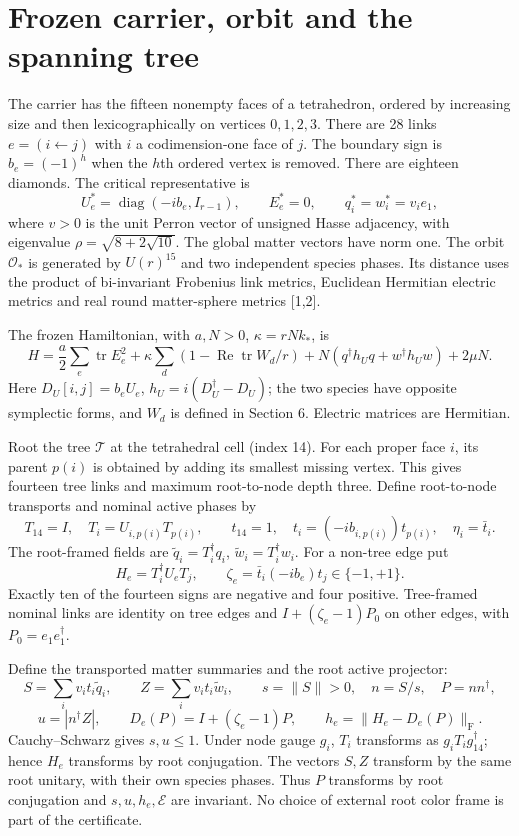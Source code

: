 \documentclass[11pt,a4paper]{article}
\newcommand{\tr}{\operatorname{tr}}\newcommand{\diag}{\operatorname{diag}}\newcommand{\Rea}{\operatorname{Re}}\newcommand{\Om}{\mathcal O_*}\newcommand{\F}{\mathrm F}
\begin{document}
\section{Frozen carrier, orbit and the spanning tree}
The carrier has the fifteen nonempty faces of a tetrahedron, ordered by increasing size and then lexicographically on vertices $0,1,2,3$. There are 28 links $e=(i\leftarrow j)$ with $i$ a codimension-one face of $j$. The boundary sign is $b_e=(-1)^h$ when the $h$th ordered vertex is removed. There are eighteen diamonds. The critical representative is
\[
U_e^*=\diag(-ib_e,I_{r-1}),\qquad E_e^*=0,\qquad q_i^*=w_i^*=v_i e_1,
\]
where $v>0$ is the unit Perron vector of unsigned Hasse adjacency, with eigenvalue $\rho=\sqrt{8+2\sqrt{10}}$. The global matter vectors have norm one. The orbit $\Om$ is generated by $U(r)^{15}$ and two independent species phases. Its distance uses the product of bi-invariant Frobenius link metrics, Euclidean Hermitian electric metrics and real round matter-sphere metrics [1,2].

The frozen Hamiltonian, with $a,N>0$, $\kappa=rNk_*$, is
\[
H=\frac a2\sum_e\tr E_e^2+\kappa\sum_d(1-\Rea\tr W_d/r)
+N(q^\dagger h_Uq+w^\dagger h_Uw)+2\mu N.
\]
Here $D_U[i,j]=b_eU_e$, $h_U=i(D_U^\dagger-D_U)$; the two species have opposite symplectic forms, and $W_d$ is defined in Section 6. Electric matrices are Hermitian.

Root the tree $\mathcal T$ at the tetrahedral cell (index 14). For each proper face $i$, its parent $p(i)$ is obtained by adding its smallest missing vertex. This gives fourteen tree links and maximum root-to-node depth three. Define root-to-node transports and nominal active phases by
\[
T_{14}=I,\quad T_i=U_{i,p(i)}T_{p(i)},\qquad
t_{14}=1,\quad t_i=(-ib_{i,p(i)})t_{p(i)},\quad \eta_i=\bar t_i.
\]
The root-framed fields are $\widetilde q_i=T_i^\dagger q_i$, $\widetilde w_i=T_i^\dagger w_i$. For a non-tree edge put
\[
H_e=T_i^\dagger U_eT_j,\qquad
\zeta_e=\bar t_i(-ib_e)t_j\in\{-1,+1\}.
\]
Exactly ten of the fourteen signs are negative and four positive. Tree-framed nominal links are identity on tree edges and $I+(\zeta_e-1)P_0$ on other edges, with $P_0=e_1e_1^\dagger$.

Define the transported matter summaries and the root active projector:
\[
S=\sum_i v_i t_i\widetilde q_i,\qquad Z=\sum_i v_i t_i\widetilde w_i,
\qquad s=\|S\|>0,\quad n=S/s,\quad P=nn^\dagger,
\]
\[
u=|n^\dagger Z|,\qquad D_e(P)=I+(\zeta_e-1)P,\qquad
h_e=\|H_e-D_e(P)\|_\F.
\]
Cauchy--Schwarz gives $s,u\le1$. Under node gauge $g_i$, $T_i$ transforms as $g_iT_i g_{14}^\dagger$; hence $H_e$ transforms by root conjugation. The vectors $S,Z$ transform by the same root unitary, with their own species phases. Thus $P$ transforms by root conjugation and $s,u,h_e,\mathcal E$ are invariant. No choice of external root color frame is part of the certificate.
\newpage
\end{document}
